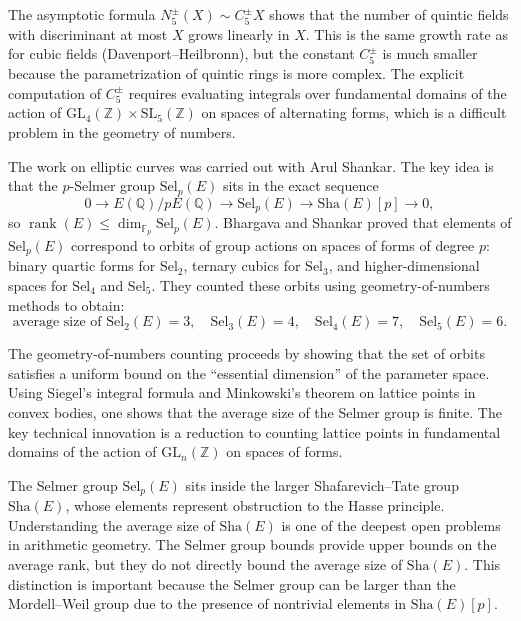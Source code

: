 The asymptotic formula $N_5^{\pm}(X) \sim C_5^{\pm} X$ shows that the number of quintic fields with discriminant at most $X$ grows linearly in $X$. This is the same growth rate as for cubic fields (Davenport--Heilbronn), but the constant $C_5^{\pm}$ is much smaller because the parametrization of quintic rings is more complex. The explicit computation of $C_5^{\pm}$ requires evaluating integrals over fundamental domains of the action of $\mathrm{GL}_4(\mathbb{Z})\times\mathrm{SL}_5(\mathbb{Z})$ on spaces of alternating forms, which is a difficult problem in the geometry of numbers.

The work on elliptic curves was carried out with Arul Shankar. The key idea is that the $p$-Selmer group $\mathrm{Sel}_p(E)$ sits in the exact sequence
\[
0 \to E(\mathbb{Q})/pE(\mathbb{Q}) \to \mathrm{Sel}_p(E) \to \mathrm{Sha}(E)[p] \to 0,
\]
so $\operatorname{rank}(E) \le \dim_{\mathbb{F}_p}\mathrm{Sel}_p(E)$. Bhargava and Shankar proved that elements of $\mathrm{Sel}_p(E)$ correspond to orbits of group actions on spaces of forms of degree $p$: binary quartic forms for $\mathrm{Sel}_2$, ternary cubics for $\mathrm{Sel}_3$, and higher-dimensional spaces for $\mathrm{Sel}_4$ and $\mathrm{Sel}_5$. They counted these orbits using geometry-of-numbers methods to obtain:
\[
\text{average size of } \mathrm{Sel}_2(E) = 3, \quad \mathrm{Sel}_3(E) = 4, \quad \mathrm{Sel}_4(E) = 7, \quad \mathrm{Sel}_5(E) = 6.
\]

The geometry-of-numbers counting proceeds by showing that the set of orbits satisfies a uniform bound on the ``essential dimension'' of the parameter space. Using Siegel's integral formula and Minkowski's theorem on lattice points in convex bodies, one shows that the average size of the Selmer group is finite. The key technical innovation is a reduction to counting lattice points in fundamental domains of the action of $\mathrm{GL}_n(\mathbb{Z})$ on spaces of forms.

The Selmer group $\mathrm{Sel}_p(E)$ sits inside the larger Shafarevich--Tate group $\mathrm{Sha}(E)$, whose elements represent obstruction to the Hasse principle. Understanding the average size of $\mathrm{Sha}(E)$ is one of the deepest open problems in arithmetic geometry. The Selmer group bounds provide upper bounds on the average rank, but they do not directly bound the average size of $\mathrm{Sha}(E)$. This distinction is important because the Selmer group can be larger than the Mordell--Weil group due to the presence of nontrivial elements in $\mathrm{Sha}(E)[p]$.

